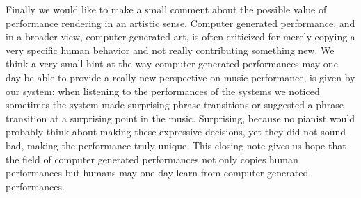 \documentclass[a4paper,10pt]{article}
\begin{document}
Finally we would like to make a small comment about the possible value of performance rendering in an artistic sense. Computer generated performance, and in a broader view, computer generated art, is often criticized for merely copying a very specific human behavior and not really contributing something new. We think a very small hint at the way computer generated performances may one day be able to provide a really new perspective on music performance, is given by our system: when listening to the performances of the systems we noticed sometimes the system made surprising phrase transitions or suggested a phrase transition at a surprising point in the music. Surprising, because no pianist would probably think about making these expressive decisions, yet they did not sound bad, making the performance truly unique. This closing note gives us hope that the field of computer generated performances not only copies human performances but humans may one day learn from computer generated performances.


\pagebreak
  
\end{document}
